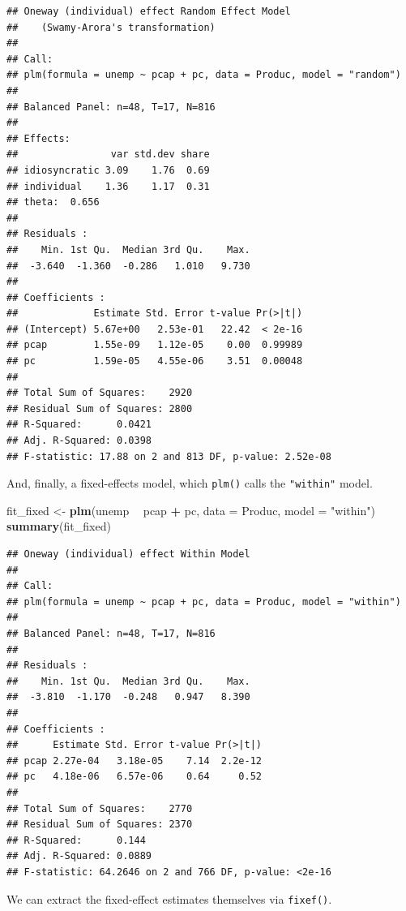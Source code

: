 \documentclass[12pt,oneside,openany]{book}
\newenvironment{Shaded}{\begin{snugshade}}{\end{snugshade}}
\newcommand{\KeywordTok}[1]{\textcolor[rgb]{0.13,0.29,0.53}{\textbf{#1}}}
\newcommand{\DataTypeTok}[1]{\textcolor[rgb]{0.13,0.29,0.53}{#1}}
\newcommand{\StringTok}[1]{\textcolor[rgb]{0.31,0.60,0.02}{#1}}
\newcommand{\OperatorTok}[1]{\textcolor[rgb]{0.81,0.36,0.00}{\textbf{#1}}}
\newcommand{\NormalTok}[1]{#1}
\begin{document}
\begin{verbatim}
## Oneway (individual) effect Random Effect Model 
##    (Swamy-Arora's transformation)
## 
## Call:
## plm(formula = unemp ~ pcap + pc, data = Produc, model = "random")
## 
## Balanced Panel: n=48, T=17, N=816
## 
## Effects:
##                var std.dev share
## idiosyncratic 3.09    1.76  0.69
## individual    1.36    1.17  0.31
## theta:  0.656  
## 
## Residuals :
##    Min. 1st Qu.  Median 3rd Qu.    Max. 
##  -3.640  -1.360  -0.286   1.010   9.730 
## 
## Coefficients :
##             Estimate Std. Error t-value Pr(>|t|)
## (Intercept) 5.67e+00   2.53e-01   22.42  < 2e-16
## pcap        1.55e-09   1.12e-05    0.00  0.99989
## pc          1.59e-05   4.55e-06    3.51  0.00048
## 
## Total Sum of Squares:    2920
## Residual Sum of Squares: 2800
## R-Squared:      0.0421
## Adj. R-Squared: 0.0398
## F-statistic: 17.88 on 2 and 813 DF, p-value: 2.52e-08
\end{verbatim}

And, finally, a fixed-effects model, which \texttt{plm()} calls the
\texttt{"within"} model.

\begin{Shaded}
\begin{Highlighting}[]
\NormalTok{fit_fixed <-}\StringTok{ }\KeywordTok{plm}\NormalTok{(unemp }\OperatorTok{~}\StringTok{ }\NormalTok{pcap }\OperatorTok{+}\StringTok{ }\NormalTok{pc,}
                 \DataTypeTok{data =}\NormalTok{ Produc,}
                 \DataTypeTok{model =} \StringTok{"within"}\NormalTok{)}
\KeywordTok{summary}\NormalTok{(fit_fixed)}
\end{Highlighting}
\end{Shaded}

\begin{verbatim}
## Oneway (individual) effect Within Model
## 
## Call:
## plm(formula = unemp ~ pcap + pc, data = Produc, model = "within")
## 
## Balanced Panel: n=48, T=17, N=816
## 
## Residuals :
##    Min. 1st Qu.  Median 3rd Qu.    Max. 
##  -3.810  -1.170  -0.248   0.947   8.390 
## 
## Coefficients :
##      Estimate Std. Error t-value Pr(>|t|)
## pcap 2.27e-04   3.18e-05    7.14  2.2e-12
## pc   4.18e-06   6.57e-06    0.64     0.52
## 
## Total Sum of Squares:    2770
## Residual Sum of Squares: 2370
## R-Squared:      0.144
## Adj. R-Squared: 0.0889
## F-statistic: 64.2646 on 2 and 766 DF, p-value: <2e-16
\end{verbatim}

We can extract the fixed-effect estimates themselves via
\texttt{fixef()}.
\end{document}
